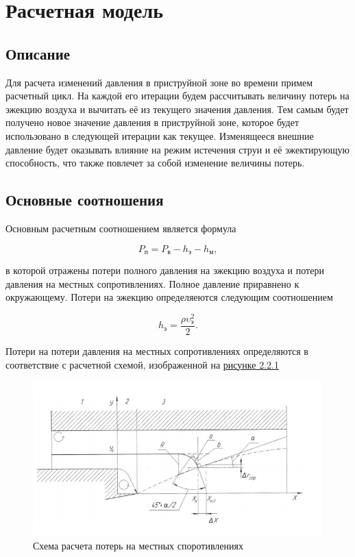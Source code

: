 \chapter{Расчетная модель}
\label{Chapter2}
\setlength{\parindent}{0pt}

\section{Описание}
Для расчета изменений давления в приструйной зоне во времени примем расчетный цикл. На каждой его итерации будем рассчитывать величину потерь на эжекцию воздуха и вычитать её из текущего значения давления. Тем самым будет получено новое значение давления в приструйной зоне, которое будет использовано в следующей итерации как текущее. Изменящееся внешние давление будет оказывать влияние на режим истечения струи и её эжектирующую способность, что также повлечет за собой изменение величины потерь.

\section{Основные соотношения}
Основным расчетным соотношением является формула 

\begin{equation}
    \label{eqn:MainPressure}
    P_\text{п}=P_\text{в}-h_\text{э}-h_\text{м},
\end{equation}

в которой отражены потери полного давления на эжекцию воздуха и потери давления на местных сопротивлениях. Полное давление приравнено к окружающему. Потери на эжекцию определяеются следующим соотношением

\begin{equation}
    \label{eqn:EjectionLosses}
    h_\text{э}=\dfrac{\rho\upsilon_\text{э}^2}{2}.
\end{equation}

Потери на потери давления на местных сопротивлениях определяются в соответствие с расчетной схемой, изображенной на \hyperref[fig:LossesScheme]{рисунке 2.2.1}

\begin{figure}[H]
    \label{fig:LossesScheme}
    \centering
    \includegraphics[height=6cm]{Figures/Scheme.png}
    \caption{Схема расчета потерь на местных споротивлениях}
\end{figure}

